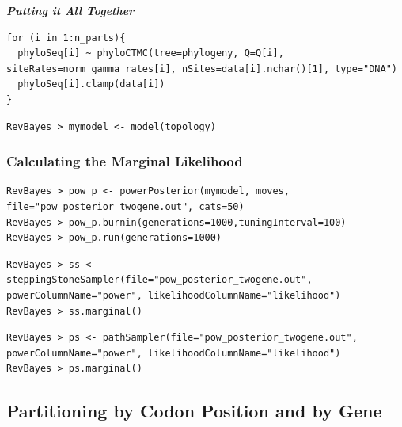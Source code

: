 \documentclass[11pt]{article}
\begin{document}
\textbf{\textit{Putting it All Together}}

{\tt \begin{snugshade*}
\begin{lstlisting}
for (i in 1:n_parts){
  phyloSeq[i] ~ phyloCTMC(tree=phylogeny, Q=Q[i], siteRates=norm_gamma_rates[i], nSites=data[i].nchar()[1], type="DNA")
  phyloSeq[i].clamp(data[i])
}
\end{lstlisting}
\end{snugshade*}}


{\tt \begin{snugshade*}
\begin{lstlisting}
RevBayes > mymodel <- model(topology)
\end{lstlisting}
\end{snugshade*}}

\subsubsection*{Calculating the Marginal Likelihood}

{\tt \begin{snugshade*}
\begin{lstlisting}
RevBayes > pow_p <- powerPosterior(mymodel, moves, file="pow_posterior_twogene.out", cats=50) 
RevBayes > pow_p.burnin(generations=1000,tuningInterval=100)
RevBayes > pow_p.run(generations=1000)  
\end{lstlisting}
\end{snugshade*}}

{\tt \begin{snugshade*}
\begin{lstlisting}
RevBayes > ss <- steppingStoneSampler(file="pow_posterior_twogene.out", powerColumnName="power", likelihoodColumnName="likelihood")
RevBayes > ss.marginal() 
\end{lstlisting}
\end{snugshade*}}

{\tt \begin{snugshade*}
\begin{lstlisting}
RevBayes > ps <- pathSampler(file="pow_posterior_twogene.out", powerColumnName="power", likelihoodColumnName="likelihood")
RevBayes > ps.marginal() 
\end{lstlisting}
\end{snugshade*}}




\bigskip
\subsection{Partitioning by Codon Position and by Gene}\label{secExtremeP}
\end{document}
